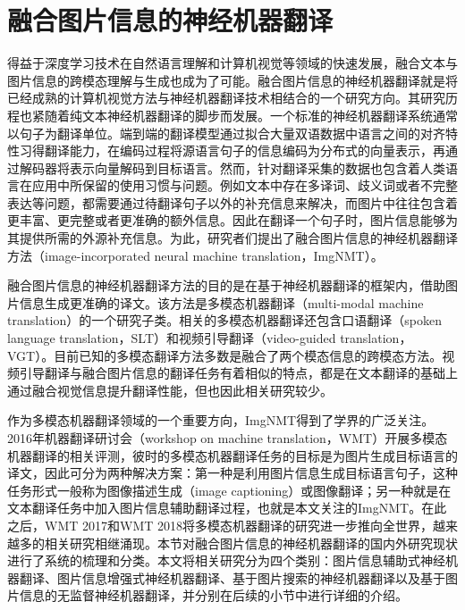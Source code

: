 \section{融合图片信息的神经机器翻译}
\label{sec:2_imgnmt}

得益于深度学习技术在自然语言理解和计算机视觉等领域的快速发展，融合文本与图片信息的跨模态理解与生成也成为了可能。融合图片信息的神经机器翻译就是将已经成熟的计算机视觉方法与神经机器翻译技术相结合的一个研究方向。其研究历程也紧随着纯文本神经机器翻译的脚步而发展。一个标准的神经机器翻译系统通常以句子为翻译单位。端到端的翻译模型通过拟合大量双语数据中语言之间的对齐特性习得翻译能力，在编码过程将源语言句子的信息编码为分布式的向量表示，再通过解码器将表示向量解码到目标语言。然而，针对翻译采集的数据也包含着人类语言在应用中所保留的使用习惯与问题。例如文本中存在多译词、歧义词或者不完整表达等问题，都需要通过待翻译句子以外的补充信息来解决，而图片中往往包含着更丰富、更完整或者更准确的额外信息。因此在翻译一个句子时，图片信息能够为其提供所需的外源补充信息。为此，研究者们提出了融合图片信息的神经机器翻译方法（image-incorporated neural machine translation，ImgNMT）。

融合图片信息的神经机器翻译方法的目的是在基于神经机器翻译的框架内，借助图片信息生成更准确的译文。该方法是多模态机器翻译（multi-modal machine translation）的一个研究子类。相关的多模态机器翻译还包含口语翻译（spoken language translation，SLT）和视频引导翻译（video-guided translation，VGT）。目前已知的多模态翻译方法多数是融合了两个模态信息的跨模态方法。视频引导翻译与融合图片信息的翻译任务有着相似的特点，都是在文本翻译的基础上通过融合视觉信息提升翻译性能，但也因此相关研究较少。

作为多模态机器翻译领域的一个重要方向，ImgNMT得到了学界的广泛关注。2016年机器翻译研讨会（workshop on machine translation，WMT）开展多模态机器翻译的相关评测，彼时的多模态机器翻译任务的目标是为图片生成目标语言的译文，因此可分为两种解决方案：第一种是利用图片信息生成目标语言句子，这种任务形式一般称为图像描述生成（image captioning）或图像翻译；另一种就是在文本翻译任务中加入图片信息辅助翻译过程，也就是本文关注的ImgNMT。在此之后，WMT 2017和WMT 2018将多模态机器翻译的研究进一步推向全世界，越来越多的相关研究相继涌现。本节对融合图片信息的神经机器翻译的国内外研究现状进行了系统的梳理和分类。本文将相关研究分为四个类别：图片信息辅助式神经机器翻译、图片信息增强式神经机器翻译、基于图片搜索的神经机器翻译以及基于图片信息的无监督神经机器翻译，并分别在后续的小节中进行详细的介绍。

